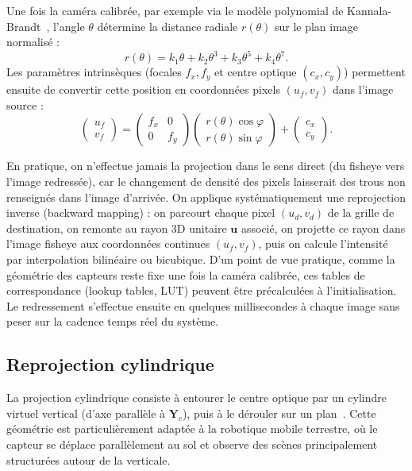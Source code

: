 \documentclass[11pt,a4paper]{article}
\renewcommand{\emph}[1]{\textup{#1}}
\begin{document}
Une fois la caméra calibrée, par exemple via le modèle polynomial de Kannala-Brandt~\cite{kannala2006}, l'angle $\theta$ détermine la distance radiale $r(\theta)$ sur le plan image normalisé :
\begin{equation}
r(\theta) = k_1\theta + k_2\theta^3 + k_3\theta^5 + k_4\theta^7.
\end{equation}
Les paramètres intrinsèques (focales $f_x, f_y$ et centre optique $(c_x, c_y)$) permettent ensuite de convertir cette position en coordonnées pixels $(u_f, v_f)$ dans l'image source :
\begin{equation}
\begin{pmatrix} u_f \\ v_f \end{pmatrix} = \begin{pmatrix} f_x & 0 \\ 0 & f_y \end{pmatrix} \begin{pmatrix} r(\theta)\cos\varphi \\ r(\theta)\sin\varphi \end{pmatrix} + \begin{pmatrix} c_x \\ c_y \end{pmatrix}.
\end{equation}

En pratique, on n'effectue jamais la projection dans le sens direct (du fisheye vers l'image redressée), car le changement de densité des pixels laisserait des trous non renseignés dans l'image d'arrivée. On applique systématiquement une \emph{reprojection inverse} (\emph{backward mapping}) : on parcourt chaque pixel $(u_d, v_d)$ de la grille de destination, on remonte au rayon 3D unitaire $\mathbf{u}$ associé, on projette ce rayon dans l'image fisheye aux coordonnées continues $(u_f, v_f)$, puis on calcule l'intensité par interpolation bilinéaire ou bicubique. D'un point de vue pratique, comme la géométrie des capteurs reste fixe une fois la caméra calibrée, ces tables de correspondance (\emph{lookup tables}, LUT) peuvent être précalculées à l'initialisation. Le redressement s'effectue ensuite en quelques millisecondes à chaque image sans peser sur la cadence temps réel du système.

\subsection{Reprojection cylindrique}

La projection cylindrique consiste à entourer le centre optique par un cylindre virtuel vertical (d'axe parallèle à $\mathbf{Y}_c$), puis à le dérouler sur un plan~\cite{bourkefish2pano,lee2026}. Cette géométrie est particulièrement adaptée à la robotique mobile terrestre, où le capteur se déplace parallèlement au sol et observe des scènes principalement structurées autour de la verticale.
\end{document}
